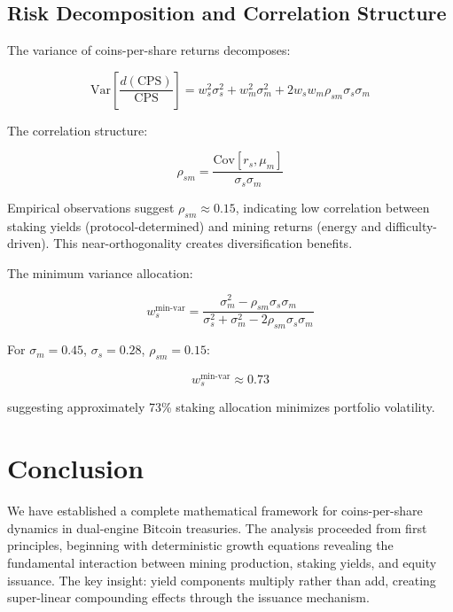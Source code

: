 \documentclass[
  journal=medium,
  manuscript=article-type,
  year=2025,
  volume=1,
]{cup-journal}
\theoremstyle{definition}
\begin{document}
\subsection{Risk Decomposition and Correlation Structure}

The variance of coins-per-share returns decomposes:

\begin{equation}
\text{Var}\left[\frac{d(\text{CPS})}{\text{CPS}}\right] = w_s^2 \sigma_s^2 + w_m^2 \sigma_m^2 + 2 w_s w_m \rho_{sm} \sigma_s \sigma_m
\end{equation}

The correlation structure:

\begin{equation}
\rho_{sm} = \frac{\text{Cov}[r_s, \mu_m]}{\sigma_s \sigma_m}
\end{equation}

Empirical observations suggest $\rho_{sm} \approx 0.15$, indicating low correlation between staking yields (protocol-determined) and mining returns (energy and difficulty-driven). This near-orthogonality creates diversification benefits.

The minimum variance allocation:

\begin{equation}
w_s^{\text{min-var}} = \frac{\sigma_m^2 - \rho_{sm} \sigma_s \sigma_m}{\sigma_s^2 + \sigma_m^2 - 2\rho_{sm} \sigma_s \sigma_m}
\end{equation}

For $\sigma_m = 0.45$, $\sigma_s = 0.28$, $\rho_{sm} = 0.15$:

\begin{equation}
w_s^{\text{min-var}} \approx 0.73
\end{equation}

suggesting approximately 73\% staking allocation minimizes portfolio volatility.

\section{Conclusion}

We have established a complete mathematical framework for coins-per-share dynamics in dual-engine Bitcoin treasuries. The analysis proceeded from first principles, beginning with deterministic growth equations revealing the fundamental interaction between mining production, staking yields, and equity issuance. The key insight: yield components multiply rather than add, creating super-linear compounding effects through the issuance mechanism.
\end{document}
